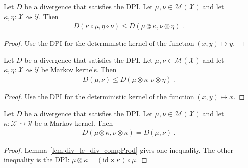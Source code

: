 \begin{lemma}
  \label{lem:div_comp_le_div_compProd}
  Let $D$ be a divergence that satisfies the DPI. Let $\mathcal \mu, \nu \in \mathcal M(\mathcal X)$ and let $\kappa, \eta : \mathcal X \rightsquigarrow \mathcal Y$. Then
  \begin{align*}
  D(\kappa \circ \mu, \eta \circ \nu) \le D(\mu \otimes \kappa, \nu \otimes \eta) \: .
  \end{align*}
\end{lemma}

\begin{proof}%
{}
Use the DPI for the deterministic kernel of the function $(x,y) \mapsto y$.
\end{proof}


\begin{lemma}
  \label{lem:div_le_div_compProd}
  Let $D$ be a divergence that satisfies the DPI. Let $\mathcal \mu, \nu \in \mathcal M(\mathcal X)$ and let $\kappa, \eta : \mathcal X \rightsquigarrow \mathcal Y$ be Markov kernels. Then
  \begin{align*}
  D(\mu, \nu) \le D(\mu \otimes \kappa, \nu \otimes \eta) \: .
  \end{align*}
\end{lemma}

\begin{proof}%
{}
Use the DPI for the deterministic kernel of the function $(x,y) \mapsto x$.
\end{proof}


\begin{lemma}
  \label{lem:div_compProd_right}
  Let $D$ be a divergence that satisfies the DPI. Let $\mathcal \mu, \nu \in \mathcal M(\mathcal X)$ and let $\kappa : \mathcal X \rightsquigarrow \mathcal Y$ be a Markov kernel. Then
  \begin{align*}
  D(\mu \otimes \kappa, \nu \otimes \kappa) = D(\mu, \nu) \: .
  \end{align*}
\end{lemma}

\begin{proof}%
{}
Lemma~\ref{lem:div_le_div_compProd} gives one inequality. The other inequality is the DPI: $\mu \otimes \kappa = (\mathrm{id} \times \kappa) \circ \mu$.
\end{proof}



